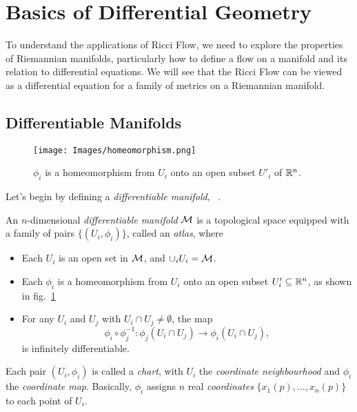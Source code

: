 \section{Basics of Differential Geometry}
To understand the applications of Ricci Flow, we need to explore the properties of Riemannian manifolds, particularly how to define a flow on a manifold and its relation to differential equations. We will see that the Ricci Flow can be viewed as a differential equation for a family of metrics on a Riemannian manifold.


\subsection{Differentiable Manifolds}
\begin{figure}
	\centering
	\texttt{[image: Images/homeomorphism.png]}
	\caption{$\phi_i$ is a homeomorphism from $U_i$ onto an open subset $U'_i$ of $\mathbb{R}^n$.}
	\label{fig:homeomorphism}
\end{figure}

Let's begin by defining a \emph{differentiable manifold}, ~\cite{lee:smooth,tu:manifolds}.

\begin{definition}
	An $n$-dimensional \emph{differentiable manifold} $\mathcal{M}$ is a topological space equipped with a family of pairs $\{ (U_i, \phi_i) \}$, called an \emph{atlas}, where
	\begin{itemize}
		\item Each $U_i$ is an open set in $\mathcal{M}$, and $\cup_i U_i = \mathcal{M}$.
		\item Each $\phi_i$ is a homeomorphism from $U_i$ onto an open subset $U_i'\subseteq \mathbb{R}^n$, as shown in fig.~\ref{fig:homeomorphism}
		\item For any $U_i$ and $U_j$ with $U_i \cap U_j \neq \emptyset$, the map
		      \begin{equation*}
			      \phi_i \circ \phi_j^{-1} \colon \phi_j (U_i \cap U_j) \to \phi_i(U_i \cap U_j),
		      \end{equation*}
		      is infinitely differentiable.
	\end{itemize}
\end{definition}

Each pair $(U_i, \phi_i)$ is called a \emph{chart}, with $U_i$ the \emph{coordinate neighbourhood} and $\phi_i$ the \emph{coordinate map}. Basically, $\phi_i$ assigns $n$ real \emph{coordinates} $\{x_1(p), \dots, x_n(p)\}$ to each point of $U_i$.

